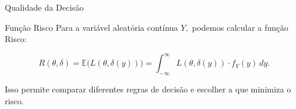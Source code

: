 \documentclass[12pt]{beamer}
\begin{document}
\begin{frame}{Qualidade da Decisão} 
	\begin{block}{Função Risco} 
		Para a variável aleatória contínua $Y,$ podemos calcular a função Risco: 

\[R(\theta, \delta) =\mathbb{E}\Big({L(\theta, \delta(y))}\Big)
			= \int_{-\infty}^{\infty} L(\theta, \delta(y)) \cdot f_Y(y)\, dy.\]

		Isso permite comparar diferentes regras de decisão e escolher a que minimiza o risco.
	\end{block} 
\end{frame}

%
%	
%	
%
%	
\end{document}
